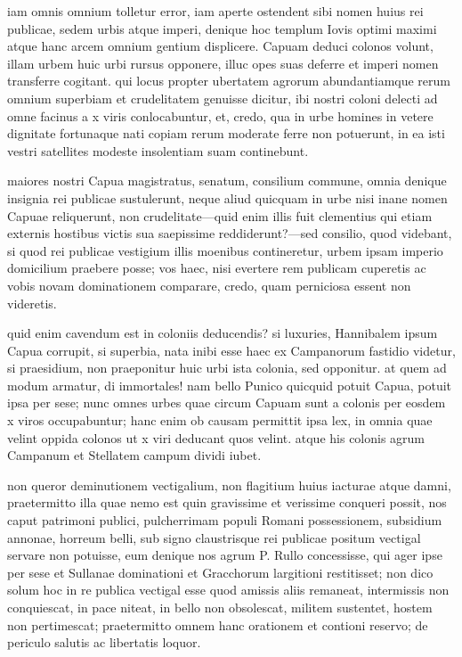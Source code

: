  iam omnis omnium tolletur error, iam aperte ostendent sibi nomen huius rei publicae, sedem urbis atque imperi, denique hoc templum Iovis optimi maximi atque hanc arcem omnium gentium displicere. Capuam deduci colonos volunt, illam urbem huic urbi rursus opponere, illuc opes suas deferre et imperi nomen transferre cogitant. qui locus propter ubertatem agrorum abundantiamque rerum omnium superbiam et crudelitatem genuisse dicitur, ibi nostri coloni delecti ad omne facinus a x viris conlocabuntur, et, credo, qua in urbe homines in vetere dignitate fortunaque nati copiam rerum moderate ferre non potuerunt, in ea isti vestri satellites modeste insolentiam suam continebunt.

 maiores nostri Capua magistratus, senatum, consilium commune, omnia denique insignia rei publicae sustulerunt, neque aliud quicquam in urbe nisi inane nomen Capuae reliquerunt, non crudelitate—quid enim illis fuit clementius qui etiam externis hostibus victis sua saepissime reddiderunt?—sed consilio, quod videbant, si quod rei publicae vestigium illis moenibus contineretur, urbem ipsam imperio domicilium praebere posse; vos haec, nisi evertere rem publicam cuperetis ac vobis novam dominationem comparare, credo, quam perniciosa essent non videretis.

 quid enim cavendum est in coloniis deducendis? si luxuries, Hannibalem ipsum Capua corrupit, si superbia, nata inibi esse haec ex Campanorum fastidio videtur, si praesidium, non praeponitur huic urbi ista colonia, sed opponitur. at quem ad modum armatur, di immortales! nam bello Punico quicquid potuit Capua, potuit ipsa per sese; nunc omnes urbes quae circum Capuam sunt a colonis per eosdem x viros occupabuntur; hanc enim ob causam permittit ipsa lex, in omnia quae velint oppida colonos ut x viri deducant quos velint. atque his colonis agrum Campanum et Stellatem campum dividi iubet.

 non queror deminutionem vectigalium, non flagitium huius iacturae atque damni, praetermitto illa quae nemo est quin gravissime et verissime conqueri possit, nos caput patrimoni publici, pulcherrimam populi Romani possessionem, subsidium annonae, horreum belli, sub signo claustrisque rei publicae positum vectigal servare non potuisse, eum denique nos agrum P. Rullo concessisse, qui ager ipse per sese et Sullanae dominationi et Gracchorum largitioni restitisset; non dico solum hoc in re publica vectigal esse quod amissis aliis remaneat, intermissis non conquiescat, in pace niteat, in bello non obsolescat, militem sustentet, hostem non pertimescat; praetermitto omnem hanc orationem et contioni reservo; de periculo salutis ac libertatis loquor.

